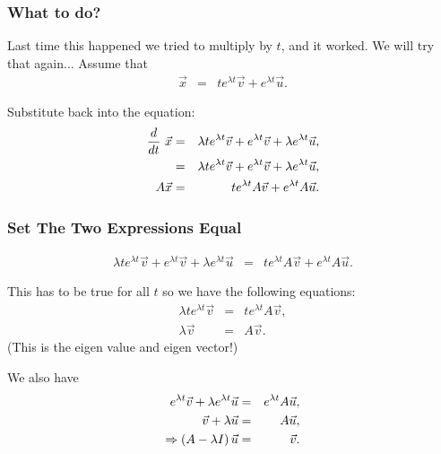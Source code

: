 \begin{frame}
  \frametitle{What to do?}

  Last time this happened we tried to multiply by $t$, and it
  worked. We will try that again...
  Assume that
  \begin{eqnarray*}
    \vec{x} & = & t e^{\lambda t} \vec{v} + e^{\lambda t} \vec{u}.
  \end{eqnarray*}

  {
    Substitute back into the equation:
    \begin{eqnarray*}
      \deriv{~}{t} \vec{x} & = & \lambda t e^{\lambda t} \vec{v} + e^{\lambda t} \vec{v} 
         + \lambda e^{\lambda t} \vec{u}, \\
         & = & 
      \lambda t e^{\lambda t} \vec{v} + e^{\lambda t} \vec{v} + \lambda e^{\lambda t} \vec{u}, \\
      A\vec{x} & = & t e^{\lambda t} A \vec{v} + e^{\lambda t} A \vec{u}.
    \end{eqnarray*}
  }
  
\end{frame}


\begin{frame}
  \frametitle{Set The Two Expressions Equal}

    \begin{eqnarray*}
      \lambda t e^{\lambda t} \vec{v} + e^{\lambda t} \vec{v} + \lambda e^{\lambda t} \vec{u}
      & = & 
      t e^{\lambda t} A \vec{v} + e^{\lambda t} A \vec{u}.
    \end{eqnarray*}
  
    This has to be true for all $t$ so we have the following equations:
    \begin{eqnarray*}
      \lambda t e^{\lambda t} \vec{v} & = & t e^{\lambda t} A \vec{v}, \\
      \lambda \vec{v} & = & A \vec{v}.
    \end{eqnarray*}
    (This is the eigen value and eigen vector!)

    We also have 
    \begin{eqnarray*}
      e^{\lambda t} \vec{v} + \lambda e^{\lambda t} \vec{u} & = & e^{\lambda t} A \vec{u}, \\
      \vec{v} + \lambda \vec{u} & = &  A \vec{u}, \\
      \Rightarrow \lp A - \lambda I \rp \vec{u} & = & \vec{v}.
    \end{eqnarray*}

\end{frame}

